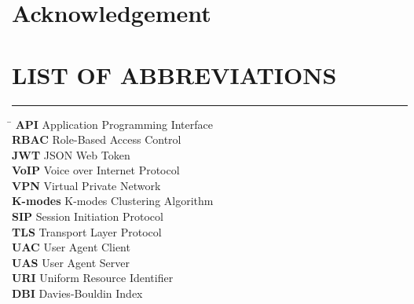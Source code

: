 \documentclass[12pt]{article}
\begin{document}


\renewcommand{\listfigurename}{LIST OF FIGURES}
\renewcommand{\cftloftitlefont}{\Large\bfseries} 
\renewcommand{\cftafterloftitle}{
    \par\noindent\vspace{-0.5em}
    \textcolor{blue}{\rule{\textwidth}{0.5pt}}
    \vspace{1em} 
}
\renewcommand{\cftfigpresnum}{Figure~}
\renewcommand{\cftfigaftersnum}{:}
\setlength{\cftfignumwidth}{5em}


\renewcommand{\contentsname}{\centering TABLE OF CONTENTS}
\begin{center}
    \tableofcontents
\end{center}
\newpage

\section*{Acknowledgement}


\newpage
\vspace{2em}
\section*{LIST OF ABBREVIATIONS}
\vspace{-0.9em}
\textcolor{blue}{\rule{\textwidth}{0.5pt}} 
\vspace{1em}
\begin{tabbing}
    \hspace{4cm} \= \hspace{10cm} \kill
    \textbf{API} \> Application Programming Interface \\
    \textbf{RBAC} \> Role-Based Access Control \\
    \textbf{JWT} \> JSON Web Token \\
    \textbf{VoIP} \> Voice over Internet Protocol \\
    \textbf{VPN} \> Virtual Private Network \\
    \textbf{K-modes} \> K-modes Clustering Algorithm \\
    \textbf{SIP} \> Session Initiation Protocol \\
    \textbf{TLS} \> Transport Layer Protocol \\
    \textbf{UAC} \> User Agent Client \\
    \textbf{UAS} \> User Agent Server \\
    \textbf{URI} \> Uniform Resource Identifier \\
    \textbf{DBI} \> Davies-Bouldin Index
\end{tabbing}
\end{document}
